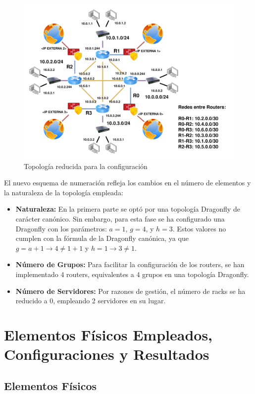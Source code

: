 \documentclass[%
    school=etsisi,%
    degree=61TI,%
]{upm-report}
\begin{document}
\begin{figure}
    \centering
    \includegraphics[width=1.0\textwidth]{figures/scaled-topology.png}
    \caption{\label{fig:scaled-topology} Topología reducida para la configuración}
\end{figure}

El nuevo esquema de numeración refleja los cambios en el número de elementos y la naturaleza de la topología empleada:
\begin{itemize}
    \item \textbf{Naturaleza:} En la primera parte se optó por una topología Dragonfly de carácter canónico. Sin embargo, para esta fase se ha configurado una Dragonfly con los parámetros: \(a = 1\), \(g = 4\), y \(h = 3\). Estos valores no cumplen con la fórmula de la Dragonfly canónica, ya que \(g = a + 1 \rightarrow 4 \neq 1 + 1\) y \(h = 1 \rightarrow 3 \neq 1\).
    \item \textbf{Número de Grupos:} Para facilitar la configuración de los routers, se han implementado 4 routers, equivalentes a 4 grupos en una topología Dragonfly.
    \item \textbf{Número de Servidores:} Por razones de gestión, el número de racks se ha reducido a 0, empleando 2 servidores en su lugar.
\end{itemize}

\section{Elementos Físicos Empleados, Configuraciones y Resultados}

\subsection{Elementos Físicos}
\end{document}
